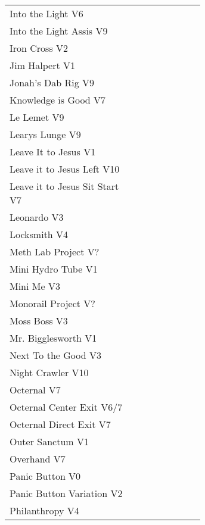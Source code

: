 \begin{flushleft}
\begin{center}
\begin{supertabular}{p{0.65\linewidth}r}
Into the Light V6 & \pageref{rt:Into the Light} \\
Into the Light Assis V9 & \pageref{vr:Into the Light Assis} \\
Iron Cross V2 & \pageref{vr:Iron Cross} \\
Jim Halpert V1 & \pageref{rt:Jim Halpert} \\
Jonah's Dab Rig V9 & \pageref{rt:Jonah's Dab Rig} \\
Knowledge is Good V7 & \pageref{rt:Knowledge is Good} \\
Le Lemet V9 & \pageref{rt:Le Lemet} \\
Learys Lunge V9 & \pageref{vr:Learys Lunge} \\
Leave It to Jesus V1 & \pageref{rt:Leave It to Jesus} \\
Leave it to Jesus Left V10 & \pageref{vr:Leave it to Jesus Left} \\
Leave it to Jesus Sit Start V7 & \pageref{vr:Leave it to Jesus Sit Start} \\
Leonardo V3 & \pageref{rt:Leonardo} \\
Locksmith V4 & \pageref{rt:Locksmith} \\
Meth Lab Project V? & \pageref{rt:Meth Lab Project} \\
Mini Hydro Tube V1 & \pageref{rt:Mini Hydro Tube} \\
Mini Me V3 & \pageref{rt:Mini Me} \\
Monorail Project V? & \pageref{rt:Monorail Project} \\
Moss Boss V3 & \pageref{rt:Moss Boss} \\
Mr. Bigglesworth V1 & \pageref{vr:Mr. Bigglesworth} \\
Next To the Good V3 & \pageref{rt:Next To the Good} \\
Night Crawler V10 & \pageref{rt:Night Crawler} \\
Octernal V7 & \pageref{rt:Octernal} \\
Octernal Center Exit V6/7 & \pageref{vr:Octernal Center Exit} \\
Octernal Direct Exit V7 & \pageref{vr:Octernal Direct Exit} \\
Outer Sanctum V1 & \pageref{rt:Outer Sanctum} \\
Overhand V7 & \pageref{rt:Overhand} \\
Panic Button V0 & \pageref{rt:Panic Button} \\
Panic Button Variation V2 & \pageref{vr:Panic Button Variation} \\
Philanthropy V4 & \pageref{rt:Philanthropy} \\

\end{supertabular}
\end{center}
\end{flushleft}
